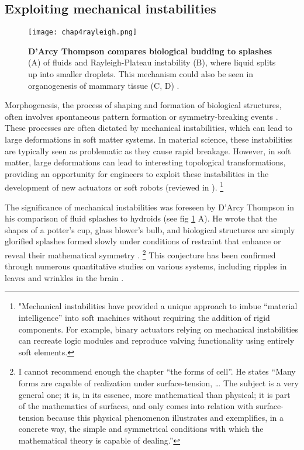 \hypertarget{exploiting-mechanical-instabilities}{%
	\subsection{Exploiting mechanical
		instabilities}\label{exploiting-mechanical-instabilities}}

\begin{figure}
	\centering
	\texttt{[image: chap4rayleigh.png]}
	\caption{\label{fig_4_4} \textbf{D'Arcy Thompson compares biological budding to splashes} (A) of fluids and Rayleigh-Plateau instability \cite{thompson1979} (B), where liquid splits up into smaller droplets. This mechanism could also be seen in organogenesis of mammary tissue (C, D) \cite{fernandez2021}.}
\end{figure}

Morphogenesis, the process of shaping and formation of biological structures, often involves spontaneous pattern formation or symmetry-breaking events \cite{ishihara2018}. These processes are often dictated by mechanical instabilities, which can lead to large deformations in soft matter systems. In material science, these instabilities are typically seen as problematic as they cause rapid breakage. However, in soft matter, large deformations can lead to interesting topological transformations, providing an opportunity for engineers to exploit these instabilities in the development of new actuators or soft robots (reviewed in \cite{pal2021}).
\footnote{"Mechanical instabilities have provided a unique approach to imbue “material intelligence” into soft machines without requiring the addition of rigid components. For example, binary actuators relying on mechanical instabilities can recreate logic modules and reproduce valving functionality using entirely soft elements.}

The significance of mechanical instabilities was foreseen by D'Arcy Thompson in his comparison of fluid splashes to hydroids (see fig \ref{fig_4_4} A). He wrote that the shapes of a potter's cup, glass blower's bulb, and biological structures are simply glorified splashes formed slowly under conditions of restraint that enhance or reveal their mathematical symmetry \cite{thompson1979}.
\footnote{ I cannot recommend enough the chapter “the forms of cell”. He states “Many forms are capable of realization under surface-tension, … The subject is a very general one; it is, in its essence, more mathematical than physical; it is part of the mathematics of surfaces, and only comes into relation with surface-tension because this physical phenomenon illustrates and exemplifies, in a concrete way, the simple and symmetrical conditions with which the mathematical theory is capable of dealing.”}
This conjecture has been confirmed through numerous quantitative studies on various systems, including ripples in leaves and wrinkles in the brain \cite{liang2009, karzbrun2018}.

